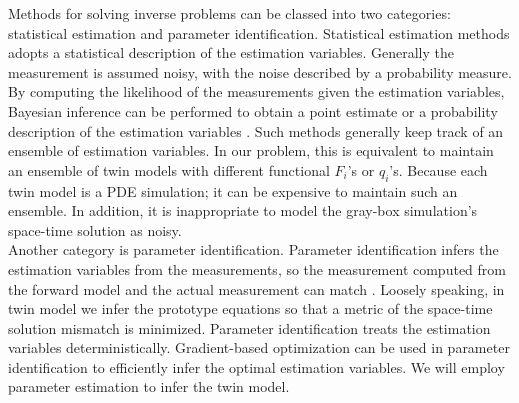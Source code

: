 \documentclass[a4paper,onecolumn]{article}
\theoremstyle{remark}
\begin{document}
\noindent Methods for solving inverse problems can be classed into two categories:
statistical estimation and parameter identification. 
Statistical estimation methods
adopts a statistical description of the estimation variables. Generally
the measurement is assumed noisy, with the noise described by a probability measure.
By computing the likelihood of the measurements given the estimation variables,
Bayesian inference can be performed to obtain a point estimate or a probability description
of the estimation variables \cite{inverse book}. Such methods generally keep track of an ensemble of 
estimation variables. In our problem, this is equivalent to maintain an ensemble of
twin models with different functional $F_i$'s or $q_i$'s.
Because each twin model is
a PDE simulation; it can be expensive to maintain such an ensemble. 
In addition, it is inappropriate to model the gray-box simulation's space-time solution as noisy.\\

\noindent Another category is parameter identification. Parameter identification
infers the estimation variables from the measurements, so the measurement computed 
from the forward model and the actual measurement can match
\cite{inverse book}.
Loosely speaking, in twin model
we infer the prototype equations so that a metric of the space-time solution mismatch is minimized.
Parameter identification treats the estimation variables deterministically. 
Gradient-based optimization can be used in parameter identification to efficiently
infer the optimal estimation variables. We will employ parameter estimation to infer
the twin model.\\
\end{document}
